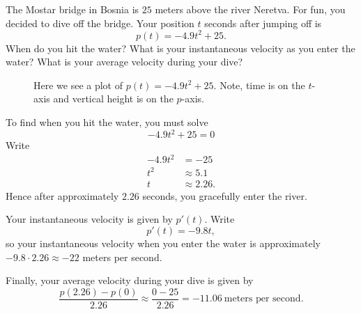 \begin{example}
    The Mostar bridge in Bosnia is $25$ meters above the river
    Neretva. For fun, you decided to dive off the bridge. Your position
    $t$ seconds after jumping off is
    $$
    p(t) = -4.9t^2 + 25.
    $$
    When do you hit the water? What is your instantaneous velocity as you
    enter the water?  What is your average velocity during your dive? \cite{mooc}
    \begin{figure}[H]
        \centering
    \caption{Here we see a plot of $p(t) = -4.9t^2 + 25$. Note, time is on
      the $t$-axis and vertical height is on the $p$-axis. \cite{mooc}}
    \end{figure}
    \begin{solution}
    To find when you hit the water, you must solve
    \[
    -4.9t^2 + 25 = 0
    \]
    Write
    \begin{align*}
    -4.9t^2 &= -25 \\
    t^2 &\approx 5.1 \\ 
    t &\approx 2.26.
    \end{align*}
    Hence after approximately $2.26$ seconds, you gracefully enter the river.
    
    Your instantaneous velocity is given by $p'(t)$. Write
    \[
    p'(t) = -9.8t,
    \]
    so your instantaneous velocity when you enter the water is
    approximately $-9.8\cdot 2.26\approx -22$ meters per second.
    
    Finally, your average velocity during your dive is given by
    \[
    \frac{p(2.26) -p(0)}{2.26} \approx \frac{0-25}{2.26} =
    -11.06~\text{meters per second}.
    \]
\end{solution}
\end{example}

